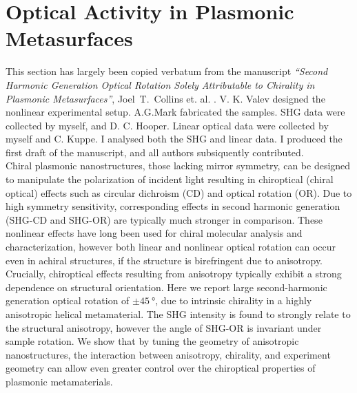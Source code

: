 \chapter{Optical Activity in Plasmonic Metasurfaces}\label{sec:results:OAinPlanarNanohelices}

This section has largely been copied verbatum from the manuscript \textit{``Second Harmonic Generation Optical Rotation Solely Attributable to Chirality in Plasmonic Metasurfaces''}, Joel~T.~Collins et. al. \cite{Collins2018b}. 
V. K. Valev designed the nonlinear experimental setup. A.G.Mark fabricated the samples. SHG data were collected by myself, and D. C. Hooper. Linear optical data were collected by myself and C. Kuppe. I analysed both the SHG and linear data. I produced the first draft of the manuscript, and all authors subsiquently contributed.
\\

Chiral plasmonic nanostructures, those lacking mirror symmetry, can be designed to manipulate the polarization of incident light resulting in chiroptical (chiral optical) effects such as circular dichroism (CD) and optical rotation (OR). Due to high symmetry sensitivity, corresponding effects in second harmonic generation (SHG-CD and SHG-OR) are typically much stronger in comparison. These nonlinear effects have long been used for chiral molecular analysis and characterization, however both linear and nonlinear optical rotation can occur even in achiral structures, if the structure is birefringent due to anisotropy. Crucially, chiroptical effects resulting from anisotropy typically exhibit a strong dependence on structural orientation. Here we report large second-harmonic generation optical rotation of $\pm\SI{45}{\degree}$, due to intrinsic chirality in a highly anisotropic helical metamaterial. The SHG intensity is found to strongly relate to the structural anisotropy, however the angle of SHG-OR is invariant under sample rotation. We show that by tuning the geometry of anisotropic nanostructures, the interaction between anisotropy, chirality, and experiment geometry can allow even greater control over the chiroptical properties of plasmonic metamaterials.

